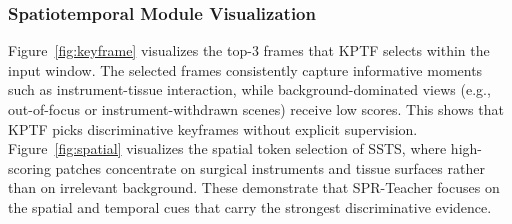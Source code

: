 \subsubsection{Spatiotemporal Module Visualization}
Figure~\ref{fig:keyframe} visualizes the top-3 frames that KPTF selects within the input window.
The selected frames consistently capture informative moments such as
instrument-tissue interaction, while background-dominated views (e.g.,
out-of-focus or instrument-withdrawn scenes) receive low scores.
This shows that KPTF picks discriminative keyframes without explicit
supervision.
Figure~\ref{fig:spatial} visualizes the spatial token selection of SSTS, where
high-scoring patches concentrate on surgical instruments and tissue surfaces rather
than on irrelevant background.
These demonstrate that SPR-Teacher focuses on the spatial and temporal
cues that carry the strongest discriminative evidence.




